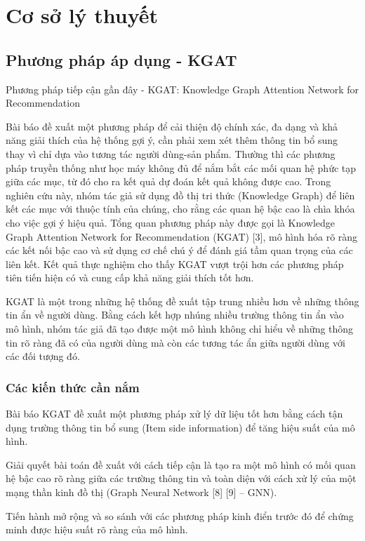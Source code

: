\section{Cơ sở lý thuyết}
\subsection{Phương pháp áp dụng - KGAT}
Phương pháp tiếp cận gần đây - KGAT: Knowledge Graph Attention Network for Recommendation

Bài báo đề xuất một phương pháp để cải thiện độ chính xác, đa dạng và khả năng giải thích của hệ thống gợi ý, cần phải xem xét thêm thông tin bổ sung thay vì chỉ dựa vào tương tác người dùng-sản phẩm. Thường thì các phương pháp truyền thống như học máy không đủ để nắm bắt các mối quan hệ phức tạp giữa các mục, từ đó cho ra kết quả dự đoán kết quả không được cao. Trong nghiên cứu này, nhóm tác giả sử dụng đồ thị tri thức (Knowledge Graph) để liên kết các mục với thuộc tính của chúng, cho rằng các quan hệ bậc cao là chìa khóa cho việc gợi ý hiệu quả. Tổng quan phương pháp này được gọi là Knowledge Graph Attention Network for Recommendation (KGAT) [3], mô hình hóa rõ ràng các kết nối bậc cao và sử dụng cơ chế chú ý để đánh giá tầm quan trọng của các liên kết. Kết quả thực nghiệm cho thấy KGAT vượt trội hơn các phương pháp tiên tiến hiện có và cung cấp khả năng giải thích tốt hơn.

KGAT là một trong những hệ thống đề xuất tập trung nhiều hơn về những thông tin ẩn về người dùng. Bằng cách kết hợp nhúng nhiều trường thông tin ẩn vào mô hình, nhóm tác giả đã tạo được một mô hình không chỉ hiểu về những thông tin rõ ràng đã có của người dùng mà còn các tương tác ẩn giữa người dùng với các đối tượng đó.

\subsubsection{Các kiến thức cần nắm}
Bài báo KGAT đề xuất một phương pháp xử lý dữ liệu tốt hơn bằng cách tận dụng trường thông tin bổ sung (Item side information) để tăng hiệu suất của mô hình. 

Giải quyết bài toán đề xuất với cách tiếp cận là tạo ra một mô hình có mối quan hệ bậc cao rõ ràng giữa các trường thông tin và toàn diện với cách xử lý của một mạng thần kinh đồ thị (Graph Neural Network [8] [9] – GNN). 

Tiến hành mở rộng và so sánh với các phương pháp kinh điển trước đó để chứng minh được hiệu suất rõ ràng của mô hình.

